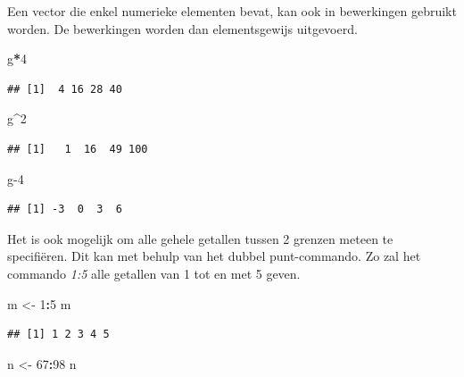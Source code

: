 \documentclass[
]{book}
\newenvironment{Shaded}{\begin{snugshade}}{\end{snugshade}}
\newcommand{\DecValTok}[1]{\textcolor[rgb]{0.00,0.00,0.81}{#1}}
\newcommand{\NormalTok}[1]{#1}
\newcommand{\OtherTok}[1]{\textcolor[rgb]{0.56,0.35,0.01}{#1}}
\newcommand{\SpecialCharTok}[1]{\textcolor[rgb]{0.81,0.36,0.00}{\textbf{#1}}}
\begin{document}
Een vector die enkel numerieke elementen bevat, kan ook in bewerkingen gebruikt worden.
De bewerkingen worden dan elementsgewijs uitgevoerd.

\begin{Shaded}
\begin{Highlighting}[]
\NormalTok{g}\SpecialCharTok{*}\DecValTok{4}
\end{Highlighting}
\end{Shaded}

\begin{verbatim}
## [1]  4 16 28 40
\end{verbatim}

\begin{Shaded}
\begin{Highlighting}[]
\NormalTok{g}\SpecialCharTok{\^{}}\DecValTok{2}
\end{Highlighting}
\end{Shaded}

\begin{verbatim}
## [1]   1  16  49 100
\end{verbatim}

\begin{Shaded}
\begin{Highlighting}[]
\NormalTok{g}\DecValTok{{-}4}
\end{Highlighting}
\end{Shaded}

\begin{verbatim}
## [1] -3  0  3  6
\end{verbatim}

Het is ook mogelijk om alle gehele getallen tussen 2 grenzen meteen te specifiëren.
Dit kan met behulp van het dubbel punt-commando. Zo zal het commando \emph{1:5} alle getallen
van 1 tot en met 5 geven.

\begin{Shaded}
\begin{Highlighting}[]
\NormalTok{m }\OtherTok{\textless{}{-}} \DecValTok{1}\SpecialCharTok{:}\DecValTok{5}
\NormalTok{m}
\end{Highlighting}
\end{Shaded}

\begin{verbatim}
## [1] 1 2 3 4 5
\end{verbatim}

\begin{Shaded}
\begin{Highlighting}[]
\NormalTok{n }\OtherTok{\textless{}{-}} \DecValTok{67}\SpecialCharTok{:}\DecValTok{98}
\NormalTok{n}
\end{Highlighting}
\end{Shaded}
\end{document}
